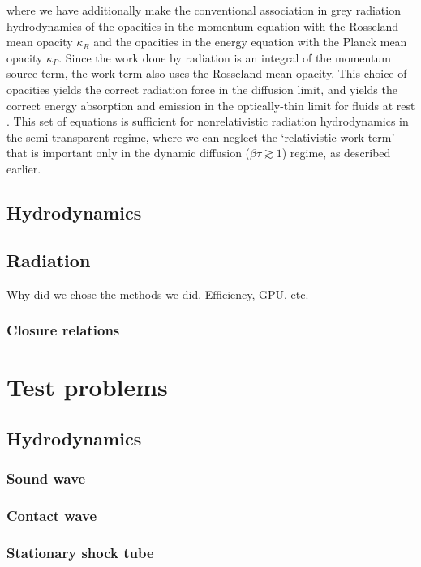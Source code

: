 \documentclass[fleqn,usenatbib]{mnras}
\begin{document}
where we have additionally make the conventional association in grey radiation hydrodynamics of the opacities in the momentum equation with the Rosseland mean opacity $\kappa_R$ and the opacities in the energy equation with the Planck mean opacity $\kappa_P$. Since the work done by radiation is an integral of the momentum source term, the work term also uses the Rosseland mean opacity. This choice of opacities yields the correct radiation force in the diffusion limit, and yields the correct energy absorption and emission in the optically-thin limit for fluids at rest \citep{Mihalas_1984}. This set of equations is sufficient for nonrelativistic radiation hydrodynamics in the semi-transparent regime, where we can neglect the `relativistic work term' that is important only in the dynamic diffusion ($\beta \tau \gtrsim 1$) regime, as described earlier.

\subsection{Hydrodynamics}

\subsection{Radiation}
Why did we chose the methods we did. Efficiency, GPU, etc.
\subsubsection{Closure relations}

\section{Test problems}
\label{section:tests}

\subsection{Hydrodynamics}
\subsubsection{Sound wave}
\subsubsection{Contact wave}
\subsubsection{Stationary shock tube}
\end{document}
